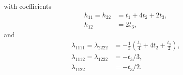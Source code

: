 \documentclass[aps,prb,twocolumn,letterpaper,twoside,nobalancelastpage,groupedaddress,amsmath,amssymb,floatfix,citeautoscript]{revtex4-1}
\begin{document}
with coefficients
\begin{align*}
h_{11} = h_{22} &= t_1 + 4t_2 + 2t_3,\\
h_{12} &= 2t_3,
\end{align*}
and 
\begin{align*}
\lambda_{1111} = \lambda_{2222} &= -\frac{1}{3}\left(\frac{t_1}{4} + 4t_2 + \frac{t_3}{2} \right),\\
\lambda_{1112}  = \lambda_{1222} &= -t_3/3,\\
\lambda_{1122} &= -t_3/2.
\end{align*}

\end{document}

